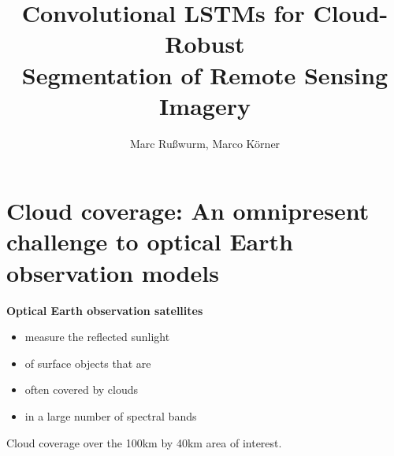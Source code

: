 \documentclass[a0]{tumposter}
\title{
	Convolutional LSTMs for Cloud-Robust \\ Segmentation of Remote Sensing Imagery%
	}
\author{
	Marc Rußwurm, Marco Körner
	}
\begin{document}
\maketitle




 

\vspace{-1em}
\section{Cloud coverage: An omnipresent challenge to optical Earth observation models}

\begin{minipage}[t]{0.49\linewidth}
	
	\textbf{Optical Earth observation satellites}
	\begin{itemize}
		\item measure the reflected sunlight
		\item of surface objects that are
		\item often covered by clouds
		\item in a large number of spectral bands
	\end{itemize}
	
	
\end{minipage}
\begin{minipage}[t]{0.49\linewidth}

	Cloud coverage over the 100km by 40km area of interest.


\end{minipage}
\end{document}
